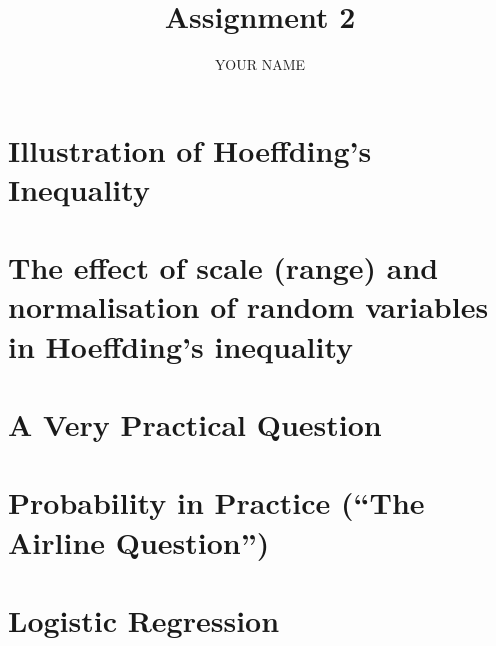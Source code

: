 \documentclass[a4paper]{article}
\title{\vspace{-5cm} Assignment 2}
\author{YOUR NAME}
\begin{document}
\maketitle

\tableofcontents

\section{Illustration of Hoeffding's Inequality}

\section{The effect of scale (range) and normalisation of random variables in
Hoeffding's inequality}

\section{A Very Practical Question}

\section{Probability in Practice (``The Airline Question'')}

\section{Logistic Regression}
\end{document}
